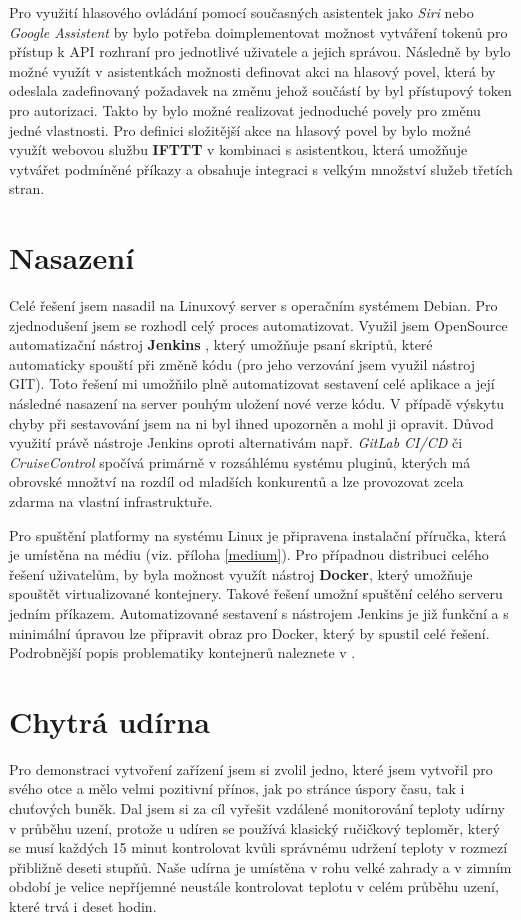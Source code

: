Pro využití hlasového ovládání pomocí současných asistentek jako \textit{Siri} nebo \textit{Google Assistent} by bylo potřeba doimplementovat možnost vytváření tokenů pro přístup k API rozhraní pro jednotlivé uživatele a jejich správou. Následně by bylo možné využít v asistentkách možnosti definovat akci na hlasový povel, která by odeslala zadefinovaný požadavek na změnu jehož součástí by byl přístupový token pro autorizaci. Takto by bylo možné realizovat jednoduché povely pro změnu jedné vlastnosti. Pro definici složitější akce na hlasový povel by bylo možné využít webovou službu \textbf{IFTTT} \cite{ifttt} v kombinaci s asistentkou, která umožňuje vytvářet podmíněné příkazy a obsahuje integraci s velkým množství služeb třetích stran.


\section{Nasazení}
Celé řešení jsem nasadil na Linuxový server s operačním systémem Debian. Pro zjednodušení jsem se rozhodl celý proces automatizovat. Využil jsem OpenSource automatizační nástroj \textbf{Jenkins} \cite{jenkins}, který umožňuje psaní skriptů, které automaticky spouští při změně kódu (pro jeho verzování jsem využil nástroj GIT). Toto řešení mi umožňilo plně automatizovat sestavení celé aplikace a její následné nasazení na server pouhým uložení nové verze kódu. V případě výskytu chyby při sestavování jsem na ni byl ihned upozorněn a mohl ji opravit. Důvod využití právě nástroje Jenkins oproti alternativám např. \textit{GitLab CI/CD} či \textit{CruiseControl} spočívá primárně v rozsáhlému systému pluginů, kterých má obrovské množtví na rozdíl od mladších konkurentů a lze provozovat zcela zdarma na vlastní infrastruktuře.

Pro spuštění platformy na systému Linux je připravena instalační příručka, která je umístěna na médiu (viz. příloha \ref{medium}). Pro případnou distribuci celého řešení uživatelům, by byla možnost využít nástroj \textbf{Docker}, který umožňuje spouštět virtualizované kontejnery. Takové řešení umožní spuštění celého serveru jedním příkazem. Automatizované sestavení s nástrojem Jenkins je již funkční a s minimální úpravou lze připravit obraz pro Docker, který by spustil celé řešení. Podrobnější popis problematiky kontejnerů naleznete v \cite{containers}.



\section{Chytrá udírna} %
Pro demonstraci vytvoření zařízení jsem si zvolil jedno, které jsem vytvořil pro svého otce a mělo velmi pozitivní přínos, jak po stránce úspory času, tak i chuťových buněk. Dal jsem si za cíl vyřešit vzdálené monitorování teploty udírny v průběhu uzení, protože u udíren se používá klasický ručičkový teploměr, který se musí každých 15 minut kontrolovat kvůli správnému udržení teploty v rozmezí přibližně deseti stupňů. Naše udírna je umístěna v rohu velké zahrady a v zimním období je velice nepříjemné neustále kontrolovat teplotu v celém průběhu uzení, které trvá i deset hodin.

